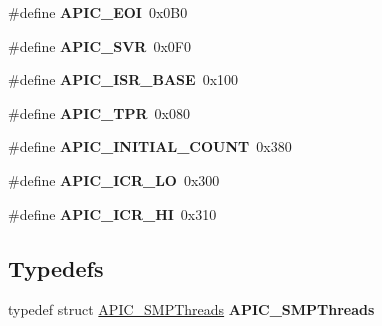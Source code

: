 \begin{DoxyCompactItemize}
\item 
\#define {\bfseries A\+P\+I\+C\+\_\+\+E\+OI}~0x0\+B0\hypertarget{group__apic__driver_ga32114b4d0dc42bb6666d90759bd04a6b}{}\label{group__apic__driver_ga32114b4d0dc42bb6666d90759bd04a6b}

\item 
\#define {\bfseries A\+P\+I\+C\+\_\+\+S\+VR}~0x0\+F0\hypertarget{group__apic__driver_gabad6e91426bdfd1f569bf2cfbe386e49}{}\label{group__apic__driver_gabad6e91426bdfd1f569bf2cfbe386e49}

\item 
\#define {\bfseries A\+P\+I\+C\+\_\+\+I\+S\+R\+\_\+\+B\+A\+SE}~0x100\hypertarget{group__apic__driver_ga19d0e8ba479e2b6650738404b23948ac}{}\label{group__apic__driver_ga19d0e8ba479e2b6650738404b23948ac}

\item 
\#define {\bfseries A\+P\+I\+C\+\_\+\+T\+PR}~0x080\hypertarget{group__apic__driver_ga2545c1ddec7ab80d2de4699ac7f50233}{}\label{group__apic__driver_ga2545c1ddec7ab80d2de4699ac7f50233}

\item 
\#define {\bfseries A\+P\+I\+C\+\_\+\+I\+N\+I\+T\+I\+A\+L\+\_\+\+C\+O\+U\+NT}~0x380\hypertarget{group__apic__driver_gae7eb03ef87ee10c7f98f3fd3810b3be9}{}\label{group__apic__driver_gae7eb03ef87ee10c7f98f3fd3810b3be9}

\item 
\#define {\bfseries A\+P\+I\+C\+\_\+\+I\+C\+R\+\_\+\+LO}~0x300\hypertarget{group__apic__driver_ga90d02b077490a673f40c97d51324143c}{}\label{group__apic__driver_ga90d02b077490a673f40c97d51324143c}

\item 
\#define {\bfseries A\+P\+I\+C\+\_\+\+I\+C\+R\+\_\+\+HI}~0x310\hypertarget{group__apic__driver_ga9093d46b27831a415e721cb6b830186b}{}\label{group__apic__driver_ga9093d46b27831a415e721cb6b830186b}

\end{DoxyCompactItemize}
\subsection*{Typedefs}
\begin{DoxyCompactItemize}
\item 
typedef struct \hyperlink{structAPIC__SMPThreads}{A\+P\+I\+C\+\_\+\+S\+M\+P\+Threads} {\bfseries A\+P\+I\+C\+\_\+\+S\+M\+P\+Threads}\hypertarget{group__apic__driver_ga5def32ab70b82543ef868f80704b394d}{}\label{group__apic__driver_ga5def32ab70b82543ef868f80704b394d}

\end{DoxyCompactItemize}
